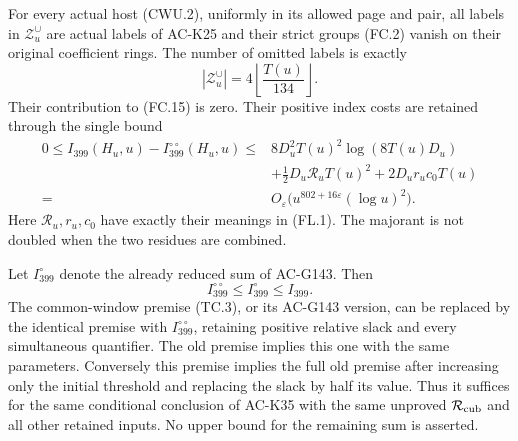 \begin{theorem}
\label{AC-G145-window}
For every actual host (CWU.2), uniformly in its allowed page and pair,
all labels in $\mathscr Z_u^{\cup}$ are actual labels of AC-K25 and
their strict groups (FC.2) vanish on their original coefficient rings.
The number of omitted labels is exactly
\[
        |\mathscr Z_u^{\cup}|=4\left\lfloor\frac{T(u)}{134}\right\rfloor.
 \tag{CWU.4}
\]
Their contribution to (FC.15) is zero.  Their positive index costs
are retained through the single bound
\[
 \begin{split}
 0\leq I_{399}(H_u,u)-I_{399}^{\circ\circ}(H_u,u)
 \leq{}&8D_u^2T(u)^2\log(8T(u)D_u)\\
 &+\tfrac12D_u\mathcal R_uT(u)^2
                         +2D_ur_uc_0T(u)\\
 ={}&O_\varepsilon\bigl(u^{802+16\varepsilon}(\log u)^2\bigr).
 \end{split}
 \tag{CWU.5}
\]
Here $\mathcal R_u,r_u,c_0$ have exactly their meanings in (FL.1).
The majorant is not doubled when the two residues are combined.

Let $I_{399}^{\circ}$ denote the already reduced sum of AC-G143.
Then
\[
       I_{399}^{\circ\circ}\leq I_{399}^{\circ}\leq I_{399}.
 \tag{CWU.6}
\]
The common-window premise (TC.3), or its AC-G143 version, can be
replaced by the identical premise with $I_{399}^{\circ\circ}$,
retaining positive relative slack and every simultaneous quantifier.
The old premise implies this one with the same parameters.
Conversely this premise implies the full old premise after increasing
only the initial threshold and replacing the slack by half its value.
Thus it suffices for the same conditional conclusion of AC-K35 with
the same unproved $\mathcal R_{\rm cub}$ and all other retained inputs.
No upper bound for the remaining sum is asserted.
\end{theorem}


